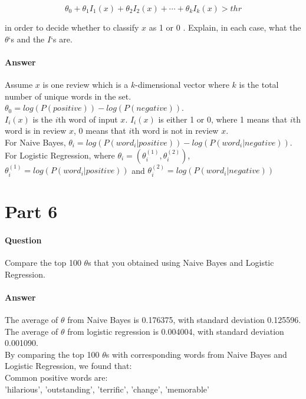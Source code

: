 \documentclass[11pt,twoside]{article}
\begin{document}
\[\theta_0+\theta_1I_1(x)+\theta_2I_2(x)+\cdots+\theta_kI_k(x) > thr\]

in order to decide whether to classify $x$ as 1 or 0 . Explain, in each case, what the $\theta$‘s and the $I$‘s are.

\paragraph{Answer}
Assume $x$ is one review which is a $k$-dimensional vector where $k$ is the total number of unique words in the set.\\
$\theta_0 = log(P(positive)) - log(P(negative))$.\\
$I_i(x)$ is the $i$th word of input $x$. $I_i(x)$ is either 1 or 0, where 1 means that $i$th word is in review $x$, 0 means that $i$th word is not in review $x$.\\
For Naive Bayes, $\theta_i = log(P(word_i | positive))  - log(P(word_i | negative))$.\\
For Logistic Regression, where $\theta_i = (\theta_i^{(1)}, \theta_i^{(2)})$, $\theta_i^{(1)} = log(P(word_i | positive))$ and $\theta_i^{(2)} = log(P(word_i | negative))$
\clearpage

\section*{Part 6}
\paragraph{Question}
Compare the top 100 $\theta$s that you obtained using Naive Bayes and Logistic Regression.
\paragraph{Answer}
The average of $\theta$ from Naive Bayes is 0.176375, with standard deviation 0.125596.\\
The average of $\theta$ from logistic regression is 0.004004, with standard deviation 0.001090.\\

By comparing the top 100 $\theta$s with corresponding words from Naive Bayes and Logistic Regression, we found that:\\

Common positive words are:\\
{'hilarious', 'outstanding', 'terrific', 'change', 'memorable'}\\
\end{document}
